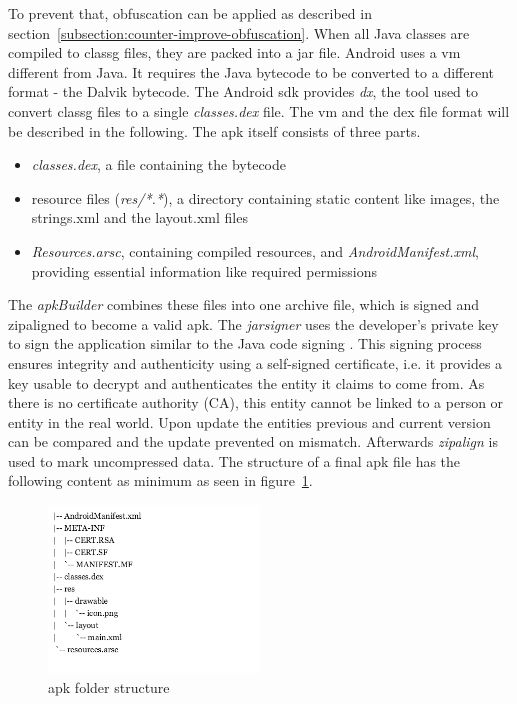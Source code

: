 To prevent that, obfuscation can be applied as described in section~\ref{subsection:counter-improve-obfuscation}.
When all Java classes are compiled to \gls{classg} files, they are packed into a \gls{jar} file.
\newline
Android uses a \gls{vm} different from Java.
It requires the Java bytecode to be converted to a different format - the Dalvik bytecode.
The Android \gls{sdk} provides \textit{dx}, the tool used to convert \gls{classg} files to a single \textit{classes.dex} file.
The \gls{vm} and the \gls{dex} file format will be described in the following.
\newline
The \gls{apk} itself consists of three parts.
\begin{itemize}
\item \textit{classes.dex}, a file containing the bytecode
\item resource files (\textit{res/*.*}), a directory containing static content like images, the strings.xml and the layout.xml files
\item \textit{Resources.arsc}, containing compiled resources, and \textit{AndroidManifest.xml}, providing essential information like required permissions
\end{itemize}
The \textit{apkBuilder} combines these files into one archive file, which is signed and zipaligned to become a valid \gls{apk}.
The \textit{jarsigner} uses the developer’s private key to sign the application similar to the Java code signing \cite{codeSigning}.
This signing process ensures integrity and authenticity using a self-signed certificate, i.e. it provides a key usable to decrypt and authenticates the entity it claims to come from.
As there is no certificate authority (CA), this entity cannot be linked to a person or entity in the real world.
Upon update the entities previous and current version can be compared and the update prevented on mismatch. \cite{nelenkovSelf}
Afterwards \textit{zipalign} is used to mark uncompressed data. \cite{androidPublishSign} \cite{androidSigning} \cite{andevconDalvikART}
\newline
\newline
The structure of a final \gls{apk} file has the following content as minimum as seen in figure~\ref{fig:apkfolder}.
\begin{figure}[h]
    \centering
    \includegraphics[width=0.5\textwidth]{data/apkfolder.png}
    \caption{\gls{apk} folder structure}
    \label{fig:apkfolder}
\end{figure}

